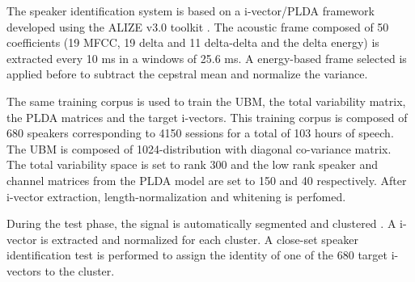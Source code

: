 The speaker identification system is based on a i-vector/PLDA framework developed using the ALIZE v3.0 toolkit \cite{larcher2013}. The acoustic frame composed of 50 coefficients (19 MFCC, 19 delta and 11 delta-delta and the delta energy) is extracted every 10 ms in a windows of 25.6 ms. A energy-based frame selected is applied before to subtract the cepstral mean and normalize the variance. 

The same training corpus is used to train the UBM, the total variability matrix, the PLDA matrices and the target i-vectors. This training corpus is composed of 680 speakers corresponding to 4150 sessions for a total of 103 hours of speech. The UBM is composed of 1024-distribution with diagonal co-variance matrix. The total variability space is set to rank 300 and the low rank speaker and channel matrices from the PLDA model are set to 150 and 40 respectively. After i-vector extraction, length-normalization and whitening is perfomed.

During the test phase, the signal is automatically segmented and clustered \cite{}. A i-vector is extracted and normalized for each cluster. A close-set speaker identification test is performed to assign the identity of one of the 680 target i-vectors to the cluster. 

 